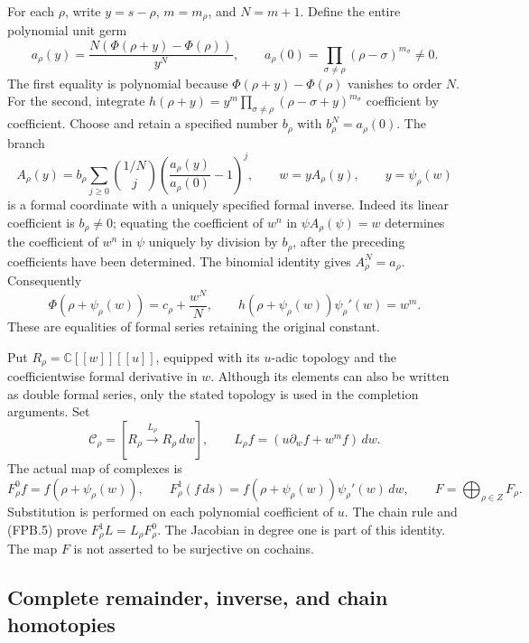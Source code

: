 For each \(\rho\), write \(y=s-\rho\), \(m=m_\rho\), and \(N=m+1\).
Define the entire polynomial unit germ
\[
 a_\rho(y)=\frac{N(\Phi(\rho+y)-\Phi(\rho))}{y^N},
 \qquad
 a_\rho(0)=\prod_{\sigma\ne\rho}(\rho-\sigma)^{m_\sigma}\ne0.
 \tag{FPB.3}\label{GraphV2:eq:fpb-a}
\]
The first equality is polynomial because \(\Phi(\rho+y)-\Phi(\rho)\)
vanishes to order \(N\). For the second, integrate
\(h(\rho+y)=y^m\prod_{\sigma\ne\rho}(\rho-\sigma+y)^{m_\sigma}\)
coefficient by coefficient. Choose and retain a specified number
\(b_\rho\) with \(b_\rho^N=a_\rho(0)\). The branch
\[
 A_\rho(y)=b_\rho
 \sum_{j\ge0}\binom{1/N}{j}
       \left(\frac{a_\rho(y)}{a_\rho(0)}-1\right)^j,
 \qquad w=yA_\rho(y),\qquad y=\psi_\rho(w)
 \tag{FPB.4}\label{GraphV2:eq:fpb-coordinate}
\]
is a formal coordinate with a uniquely specified formal inverse.
Indeed its linear coefficient is \(b_\rho\ne0\); equating the
coefficient of \(w^n\) in \(\psi A_\rho(\psi)=w\) determines the
coefficient of \(w^n\) in \(\psi\) uniquely by division by
\(b_\rho\), after the preceding coefficients have been determined.
The binomial identity gives \(A_\rho^N=a_\rho\). Consequently
\[
 \Phi(\rho+\psi_\rho(w))=c_\rho+\frac{w^N}{N},
 \qquad h(\rho+\psi_\rho(w))\psi_\rho'(w)=w^m.
 \tag{FPB.5}\label{GraphV2:eq:fpb-phase}
\]
These are equalities of formal series retaining the original constant.

Put \(R_\rho=\mathbb{C}[[w]][[u]]\), equipped with its \(u\)-adic
topology and the coefficientwise formal derivative in \(w\). Although
its elements can also be written as double formal series, only the
stated topology is used in the completion arguments. Set
\[
 \mathcal C_\rho=[R_\rho\xrightarrow{L_\rho}R_\rho\,dw],
 \qquad L_\rho f=(u\partial_w f+w^m f)\,dw.
 \tag{FPB.6}\label{GraphV2:eq:fpb-local-complex}
\]
The actual map of complexes is
\[
 F^0_\rho f=f(\rho+\psi_\rho(w)),\qquad
 F^1_\rho(f\,ds)=f(\rho+\psi_\rho(w))\psi_\rho'(w)\,dw,
 \qquad F=\bigoplus_{\rho\in Z}F_\rho.
 \tag{FPB.7}\label{GraphV2:eq:fpb-chain-map}
\]
Substitution is performed on each polynomial coefficient of \(u\).
The chain rule and (FPB.5) prove \(F^1_\rho L=L_\rho F^0_\rho\).
The Jacobian in degree one is part of this identity. The map \(F\)
is not asserted to be surjective on cochains.

\subsection{Complete remainder, inverse, and chain homotopies}

